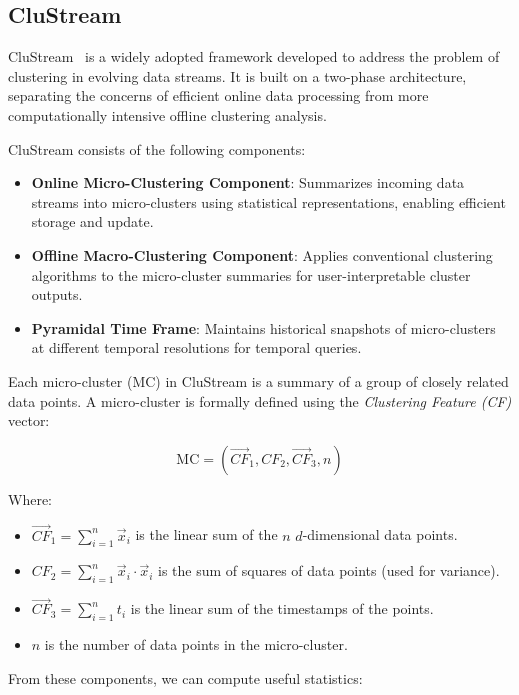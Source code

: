 \subsection{CluStream}\label{subsec:clustream}
CluStream~\cite{clustream} is a widely adopted framework developed to address
the problem of clustering in evolving data streams. It is built on a two-phase
architecture, separating the concerns of efficient online data processing from
more computationally intensive offline clustering analysis.

CluStream consists of the following components:
\begin{itemize}
    \item \textbf{Online Micro-Clustering Component}: Summarizes incoming data streams into
          micro-clusters using statistical representations, enabling efficient storage and update.
    \item \textbf{Offline Macro-Clustering Component}: Applies conventional clustering
          algorithms to the micro-cluster summaries for user-interpretable cluster outputs.
    \item \textbf{Pyramidal Time Frame}: Maintains historical snapshots of micro-clusters
          at different temporal resolutions for temporal queries.
\end{itemize}

Each micro-cluster (MC) in CluStream is a summary of a group of closely related
data points. A micro-cluster is formally defined using the \textit{Clustering
    Feature (CF)} vector:

\begin{equation}
    \text{MC} = \left( \vec{CF}_1, CF_2, \vec{CF}_3, n \right)
\end{equation}

Where:
\begin{itemize}
    \item $\vec{CF}_1 = \sum_{i=1}^{n} \vec{x}_i$ is the linear sum of the $n$ $d$-dimensional data points.
    \item $CF_2 = \sum_{i=1}^{n} \vec{x}_i \cdot \vec{x}_i$ is the sum of squares of data points
          (used for variance).
    \item $\vec{CF}_3 = \sum_{i=1}^{n} t_i$ is the linear sum of the timestamps of the points.
    \item $n$ is the number of data points in the micro-cluster.
\end{itemize}

From these components, we can compute useful statistics:

